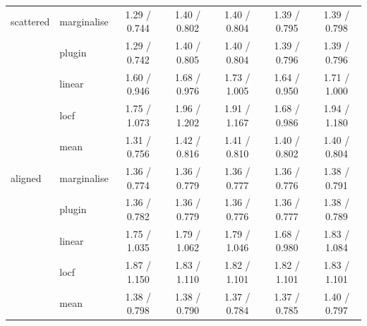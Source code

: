 \begin{table}[htbp]
\begin{tabular}{llccccc}
    \addlinespace
    scattered & marginalise & 1.29 / 0.744 & 1.40 / 0.802 & 1.40 / 0.804 & 1.39 / 0.795 & 1.39 / 0.798 \\
     & plugin & 1.29 / 0.742 & 1.40 / 0.805 & 1.40 / 0.804 & 1.39 / 0.796 & 1.39 / 0.796 \\
     & linear & 1.60 / 0.946 & 1.68 / 0.976 & 1.73 / 1.005 & 1.64 / 0.950 & 1.71 / 1.000 \\
     & locf & 1.75 / 1.073 & 1.96 / 1.202 & 1.91 / 1.167 & 1.68 / 0.986 & 1.94 / 1.180 \\
     & mean & 1.31 / 0.756 & 1.42 / 0.816 & 1.41 / 0.810 & 1.40 / 0.802 & 1.40 / 0.804 \\
    \addlinespace
    aligned & marginalise & 1.36 / 0.774 & 1.36 / 0.779 & 1.36 / 0.777 & 1.36 / 0.776 & 1.38 / 0.791 \\
     & plugin & 1.36 / 0.782 & 1.36 / 0.779 & 1.36 / 0.776 & 1.36 / 0.777 & 1.38 / 0.789 \\
     & linear & 1.75 / 1.035 & 1.79 / 1.062 & 1.79 / 1.046 & 1.68 / 0.980 & 1.83 / 1.084 \\
     & locf & 1.87 / 1.150 & 1.83 / 1.110 & 1.82 / 1.101 & 1.82 / 1.101 & 1.83 / 1.101 \\
     & mean & 1.38 / 0.798 & 1.38 / 0.790 & 1.37 / 0.784 & 1.37 / 0.785 & 1.40 / 0.797 \\
    \bottomrule
  \end{tabular}
\end{table}
